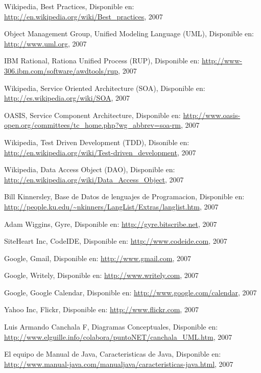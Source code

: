 \begin{thebibliography}{99}
 Wikipedia, Best Practices, Disponible en:
	\url{http://en.wikipedia.org/wiki/Best_practices}, 2007

 Object Management Group, Unified Modeling Language (UML), Disponible en:
	\url{http://www.uml.org}, 2007

 IBM Rational, Rationa Unified Process (RUP), Disponible en:
	\url{http://www-306.ibm.com/software/awdtools/rup}, 2007

 Wikipedia, Service Oriented Architecture (SOA), Disponible en:
	\url{http://es.wikipedia.org/wiki/SOA}, 2007

 OASIS, Service Component Architecture, Disponible en:
	\url{http://www.oasis-open.org/committees/tc_home.php?wg_abbrev=soa-rm}, 2007

 Wikipedia, Test Driven Development (TDD), Disonible en:
	\url{http://en.wikipedia.org/wiki/Test-driven_development}, 2007

 Wikipedia, Data Access Object (DAO), Disponible en:
	\url{http://en.wikipedia.org/wiki/Data_Access_Object}, 2007

 Bill Kinnersley, Base de Datos de lenguajes de Programacion, Disponible en:
	\url{http://people.ku.edu/~nkinners/LangList/Extras/langlist.htm}, 2007

 Adam Wiggins, Gyre, Disponible en:
	\url{http://gyre.bitscribe.net}, 2007

 SiteHeart Inc, CodeIDE, Disponible en:
	\url{http://www.codeide.com}, 2007

 Google, Gmail, Disponible en:
	\url{http://www.gmail.com}, 2007

 Google, Writely, Disponible en:
	\url{http://www.writely.com}, 2007

 Google, Google Calendar, Disponible en:
	\url{http://www.google.com/calendar}, 2007

 Yahoo Inc, Flickr, Disponible en:
	\url{http://www.flickr.com}, 2007

 Luis Armando Canchala F, Diagramas Conceptuales, Disponible en:
	\url{http://www.elguille.info/colabora/puntoNET/canchala_UML.htm}, 2007

 El equipo de Manual de Java, Caracteristicas de Java, Disponible en:
	\url{http://www.manual-java.com/manualjava/caracteristicas-java.html}, 2007

\end{thebibliography}
